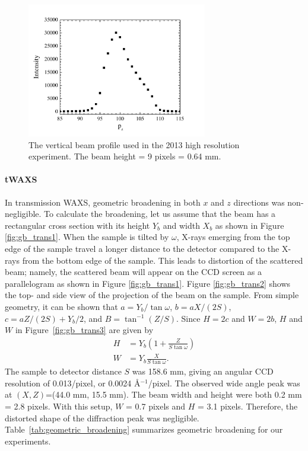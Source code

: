 \begin{figure}[htbp]
  \centering
  \includegraphics[width=0.7\textwidth]{figures/ripple/MMs/waxs/beamz_hr}
  \caption[The vertical beam profile used in the 2013 high resolution experiment]
  {The vertical beam profile used in the 2013 high resolution experiment.
  The beam height = 9 pixels = 0.64 mm.}
  \label{fig:nGIWAXS_beamz}
\end{figure} 

\paragraph{tWAXS}
In transmission WAXS, 
geometric broadening in both $x$ and $z$ directions was non-negligible.
To calculate the broadening, let us assume that the beam has a rectangular
cross section with its height $Y_b$ and width $X_b$ as shown in Figure 
\ref{fig:gb_trans1}. When the sample is tilted by $\omega$, X-rays emerging 
from the top edge of the sample travel a longer distance to the detector
compared to the X-rays from the bottom edge of the sample. 
This leads to 
distortion of the scattered beam; namely, the scattered beam will appear on 
the CCD screen as a parallelogram as shown in Figure 
\ref{fig:gb_trans1}. 
Figure \ref{fig:gb_trans2} shows the top- and 
side view of the 
projection of the beam on the sample. From simple geometry, it can be shown 
that $a=Y_b/\tan\omega$, $b=aX/(2S)$, $c=aZ/(2S)+Y_b/2$, and $B=\tan^{-1}(Z/S)$. 
Since $H=2c$ and $W=2b$, $H$ and $W$ in Figure~\ref{fig:gb_trans3} are 
given by
\begin{align}
	H &= Y_b\left(1+\frac{Z}{S\tan\omega}\right)\\
	W &= Y_b\frac{X}{S\tan\omega}.
\end{align}
The sample to detector distance $S$ was 158.6 mm, giving an angular
CCD resolution of 0.013\textdegree/pixel, 
or 0.0024 \AA$^{-1}$/pixel.
The observed wide angle peak was at $(X,Z)$=(44.0 mm, 15.5 mm). 
The beam width and height were both 0.2 mm = 2.8 pixels.
With this setup, $W$ = 0.7 pixels and $H$ = 3.1 pixels. 
Therefore, the distorted shape of the diffraction peak was negligible.
Table~\ref{tab:geometric_broadening} summarizes geometric broadening for
our experiments.

